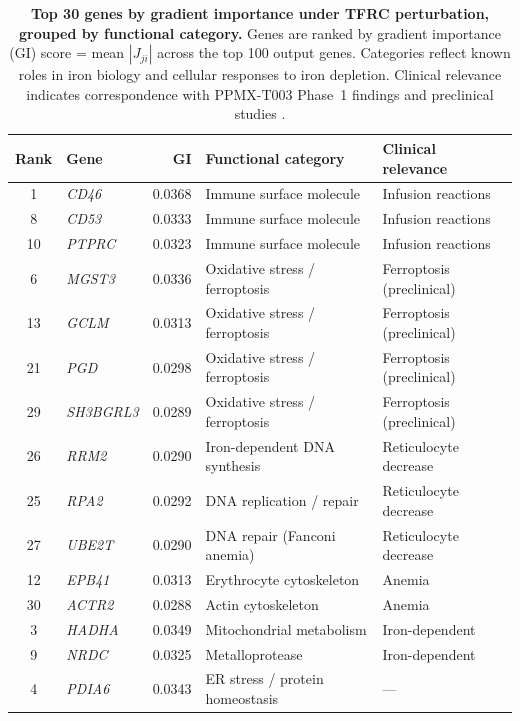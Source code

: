 \documentclass[12pt,a4paper]{article}
\begin{document}
\begin{table}[H]
\centering
\footnotesize
\caption{\textbf{Top 30 genes by gradient importance under TFRC perturbation, grouped by functional category.} Genes are ranked by gradient importance (GI) score = mean $|J_{ji}|$ across the top 100 output genes. Categories reflect known roles in iron biology and cellular responses to iron depletion. Clinical relevance indicates correspondence with PPMX-T003 Phase~1 findings \citep{ogama2023} and preclinical studies \citep{fauzi2025}.}
\label{tab:tfrc_top30}
\begin{tabular}{clrll}
\toprule
\textbf{Rank} & \textbf{Gene} & \textbf{GI} & \textbf{Functional category} & \textbf{Clinical relevance} \\
\midrule
1 & \textit{CD46} & 0.0368 & Immune surface molecule & Infusion reactions \\
8 & \textit{CD53} & 0.0333 & Immune surface molecule & Infusion reactions \\
10 & \textit{PTPRC} & 0.0323 & Immune surface molecule & Infusion reactions \\
\midrule
6 & \textit{MGST3} & 0.0336 & Oxidative stress / ferroptosis & Ferroptosis (preclinical) \\
13 & \textit{GCLM} & 0.0313 & Oxidative stress / ferroptosis & Ferroptosis (preclinical) \\
21 & \textit{PGD} & 0.0298 & Oxidative stress / ferroptosis & Ferroptosis (preclinical) \\
29 & \textit{SH3BGRL3} & 0.0289 & Oxidative stress / ferroptosis & Ferroptosis (preclinical) \\
\midrule
26 & \textit{RRM2} & 0.0290 & Iron-dependent DNA synthesis & Reticulocyte decrease \\
25 & \textit{RPA2} & 0.0292 & DNA replication / repair & Reticulocyte decrease \\
27 & \textit{UBE2T} & 0.0290 & DNA repair (Fanconi anemia) & Reticulocyte decrease \\
\midrule
12 & \textit{EPB41} & 0.0313 & Erythrocyte cytoskeleton & Anemia \\
30 & \textit{ACTR2} & 0.0288 & Actin cytoskeleton & Anemia \\
\midrule
3 & \textit{HADHA} & 0.0349 & Mitochondrial metabolism & Iron-dependent \\
9 & \textit{NRDC} & 0.0325 & Metalloprotease & Iron-dependent \\
\midrule
4 & \textit{PDIA6} & 0.0343 & ER stress / protein homeostasis & --- \\

\end{tabular}
\end{table}
\end{document}
